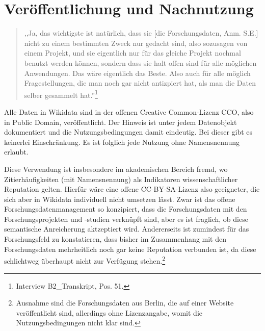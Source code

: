 \section{Veröffentlichung und Nachnutzung}

\begin{quote}
    ,,Ja, das wichtigste ist natürlich, dass sie [die Forschungsdaten, Anm. S.E.] nicht zu einem bestimmten Zweck nur gedacht sind, also sozusagen von einem Projekt, und sie eigentlich nur für das gleiche Projekt nochmal benutzt werden können, sondern dass sie halt offen sind für alle möglichen Anwendungen. Das wäre eigentlich das Beste. Also auch für alle möglich Fragestellungen, die man noch gar nicht antizpiert hat, als man die Daten selber gesammelt hat.''\footnote{Interview B2\_Transkript, Pos. 51.}
\end{quote}

Alle Daten in Wikidata sind in der offenen Creative Common-Lizenz CCO, also in Public Domain, veröffentlicht. Der Hinweis ist unter jedem Datenobjekt dokumentiert und die Nutzungsbedingungen damit eindeutig. Bei dieser gibt es keinerlei Einschränkung. Es ist folglich jede Nutzung ohne Namensnennung erlaubt.

Diese Verwendung ist insbesondere im akademischen Bereich fremd, wo Zitierhäufigkeiten (mit Namensnennung) als Indikatoren wissenschaftlicher Reputation gelten. Hierfür wäre eine offene CC-BY-SA-Lizenz also geeigneter, die sich aber in Wikidata individuell nicht umsetzen lässt. Zwar ist das offene Forschungsdatenmanagement so konzipiert, dass die Forschungsdaten mit den Forschungsprojekten und -studien verknüpft sind, aber es ist fraglich, ob diese semantische Anreicherung aktzeptiert wird. Andererseits ist zumindest für das Forschungsfeld zu konstatieren, dass bisher im Zusammenhang mit den Forschungsdaten mehrheitlich noch gar keine Reputation verbunden ist, da diese schlichtweg überhaupt nicht zur Verfügung stehen.\footnote{Ausnahme sind die Forschungsdaten aus Berlin, die auf einer Website veröffentlicht sind, allerdings ohne Lizenzangabe, womit die Nutzungsbedingungen nicht klar sind.}

